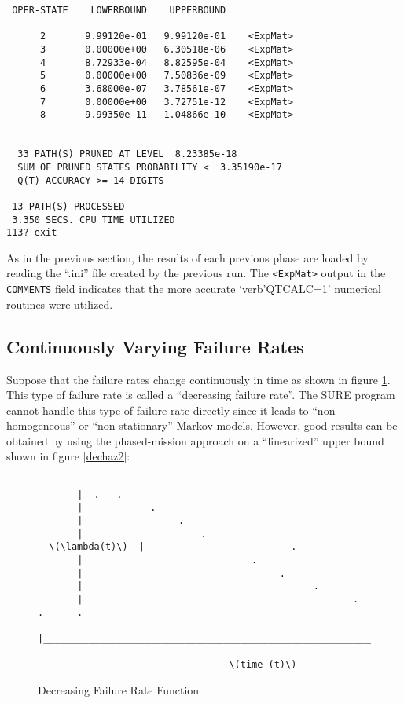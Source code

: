 \begin{verbatim}
 OPER-STATE    LOWERBOUND    UPPERBOUND
 ----------   -----------   -----------
      2       9.99120e-01   9.99120e-01    <ExpMat>
      3       0.00000e+00   6.30518e-06    <ExpMat>
      4       8.72933e-04   8.82595e-04    <ExpMat>
      5       0.00000e+00   7.50836e-09    <ExpMat>
      6       3.68000e-07   3.78561e-07    <ExpMat>
      7       0.00000e+00   3.72751e-12    <ExpMat>
      8       9.99350e-11   1.04866e-10    <ExpMat>


  33 PATH(S) PRUNED AT LEVEL  8.23385e-18
  SUM OF PRUNED STATES PROBABILITY <  3.35190e-17
  Q(T) ACCURACY >= 14 DIGITS

 13 PATH(S) PROCESSED
 3.350 SECS. CPU TIME UTILIZED
113? exit
\end{verbatim}

As in the previous section, the results of each previous phase are loaded
by reading the ``.ini'' file created by the previous run.  The
\verb!<ExpMat>! output in the \verb'COMMENTS' field indicates that the
more accurate `verb'QTCALC=1' numerical routines were utilized.

\subsection{Continuously Varying Failure Rates}

Suppose that the failure rates change continuously in time as shown in
figure \ref{dechaz}.  This type of failure rate is called a
``decreasing failure rate''.  The
SURE program cannot handle this type of failure rate directly since it
leads to ``non-homogeneous'' or ``non-stationary'' Markov models.
However, good results can be obtained by using the phased-mission
approach on a ``linearized'' upper bound shown in figure \ref{dechaz2}:

\begin{figure}
\begin{verbatim}
  
       |  .   .
       |            .
       |                 .
       |                     .
  \(\lambda(t)\)  |                          .
       |                              .
       |                                   .
       |                                         .
       |                                                .   .      .
       |________________________________________________________________

                                  \(time (t)\)
\end{verbatim}
\caption{Decreasing Failure Rate Function}
\label{dechaz}
\end{figure}

